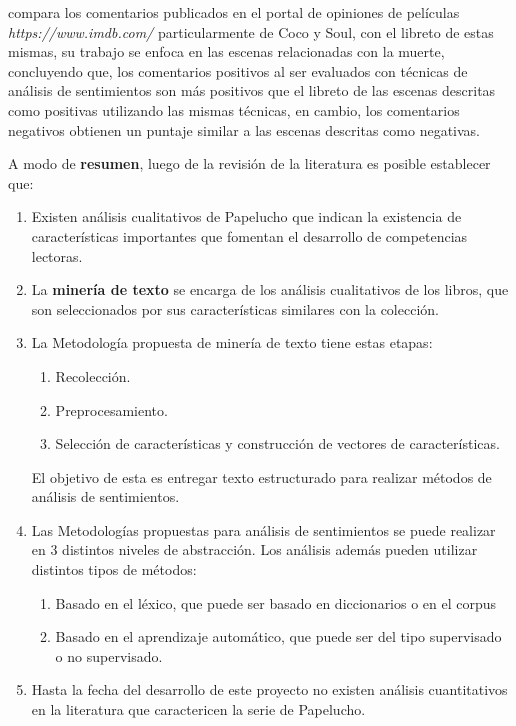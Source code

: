 \citet{hsu2021emotional}  compara los comentarios publicados en el portal de opiniones de películas \textit{https://www.imdb.com/} particularmente de Coco y Soul, con el libreto de estas mismas, su trabajo se enfoca en las escenas relacionadas con la muerte, concluyendo que, los comentarios positivos al ser evaluados con técnicas de análisis de sentimientos son más positivos que el libreto de las escenas descritas como positivas utilizando las mismas técnicas, en cambio, los comentarios negativos obtienen un puntaje similar a las escenas descritas como negativas.

A modo de \textbf{resumen}, luego de la revisión de la literatura es posible establecer que: 
\begin{enumerate}
    \item Existen análisis cualitativos de Papelucho que indican la existencia de características importantes que fomentan el desarrollo de competencias lectoras.
    \item La \textbf{minería de texto} se encarga de los análisis cualitativos de los libros, que son seleccionados por sus características similares con la colección.
    \item La Metodología propuesta de minería de texto tiene estas etapas: 
    \begin{enumerate}
        \item Recolección.
        \item Preprocesamiento.
        \item Selección de características y construcción de vectores de características.
    \end{enumerate}
    El objetivo de esta es entregar texto estructurado para realizar métodos de análisis de sentimientos.
    \item Las Metodologías propuestas para análisis de sentimientos se puede realizar en 3 distintos niveles de abstracción. Los análisis además pueden utilizar distintos tipos de métodos:
\begin{enumerate}
    \item Basado en el léxico, que puede ser basado en diccionarios o en el corpus
    \item Basado en el aprendizaje automático, que puede ser del tipo supervisado o no supervisado.
\end{enumerate}  
    \item Hasta la fecha del desarrollo de este proyecto no existen análisis cuantitativos en la literatura que caractericen la serie de Papelucho.
\end{enumerate}


